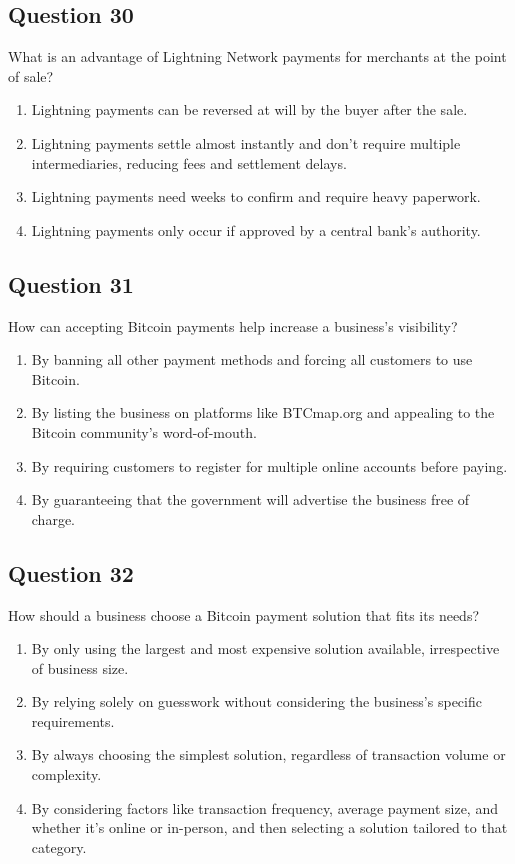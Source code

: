 \documentclass[12pt,a4paper]{article}
\begin{document}
\bigskip


\subsection*{Question 30}
What is an advantage of Lightning Network payments for merchants at the point of sale?

\begin{enumerate}[label=\Alph*., leftmargin=*]
\item Lightning payments can be reversed at will by the buyer after the sale.
\item Lightning payments settle almost instantly and don’t require multiple intermediaries, reducing fees and settlement delays.
\item Lightning payments need weeks to confirm and require heavy paperwork.
\item Lightning payments only occur if approved by a central bank’s authority.
\end{enumerate}

\bigskip


\subsection*{Question 31}
How can accepting Bitcoin payments help increase a business’s visibility?

\begin{enumerate}[label=\Alph*., leftmargin=*]
\item By banning all other payment methods and forcing all customers to use Bitcoin.
\item By listing the business on platforms like BTCmap.org and appealing to the Bitcoin community’s word-of-mouth.
\item By requiring customers to register for multiple online accounts before paying.
\item By guaranteeing that the government will advertise the business free of charge.
\end{enumerate}

\bigskip


\subsection*{Question 32}
How should a business choose a Bitcoin payment solution that fits its needs?

\begin{enumerate}[label=\Alph*., leftmargin=*]
\item By only using the largest and most expensive solution available, irrespective of business size.
\item By relying solely on guesswork without considering the business’s specific requirements.
\item By always choosing the simplest solution, regardless of transaction volume or complexity.
\item By considering factors like transaction frequency, average payment size, and whether it’s online or in-person, and then selecting a solution tailored to that category.
\end{enumerate}
\end{document}
